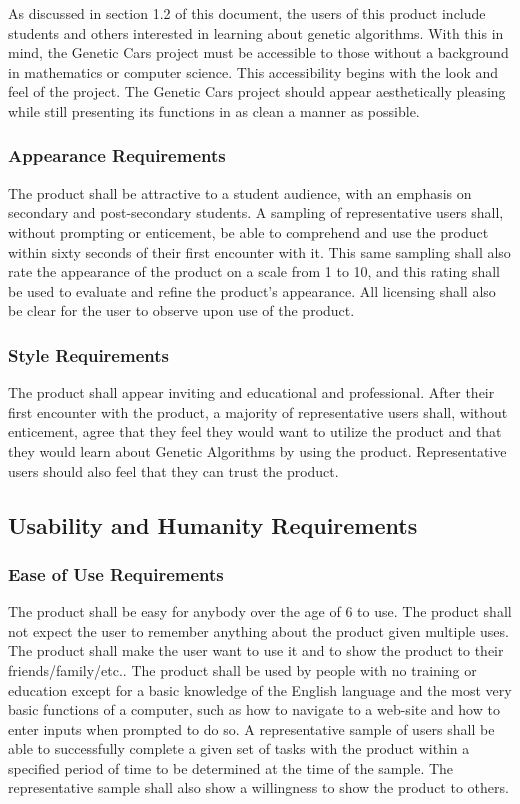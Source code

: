 \documentclass[12pt, titlepage]{article}
\begin{document}
As discussed in section 1.2 of this document, the users of this product include 
students and others interested in learning about genetic algorithms. With this 
in mind, the Genetic Cars project must be accessible to those without a 
background in mathematics or computer science. This accessibility begins with 
the look and feel of the project. The Genetic Cars project should appear 
aesthetically pleasing while still presenting its functions in as clean a manner 
as possible.

\subsubsection{Appearance Requirements}

The product shall be attractive to a student audience, with an emphasis on 
secondary and post-secondary students. A sampling of representative users shall, 
without prompting or enticement, be able to comprehend and use the product 
within sixty seconds of their first encounter with it. This same sampling shall 
also rate the appearance of the product on a scale from 1 to 10, and this rating 
shall be used to evaluate and refine the product's appearance. All licensing 
shall also be clear for the user to observe upon use of the product.

\subsubsection{Style Requirements}

The product shall appear inviting and educational and professional. After their 
first encounter with the product, a majority of representative users shall, 
without enticement, agree that they feel they would want to utilize the product 
and that they would learn about Genetic Algorithms by using the product. 
Representative users should also feel that they can trust the product.

\subsection{Usability and Humanity Requirements}

\subsubsection{Ease of Use Requirements}

The product shall be easy for anybody over the age of 6 to use. The product 
shall not expect the user to remember anything about the product given multiple 
uses. The product shall make the user want to use it and to show the product to 
their friends/family/etc.. The product shall be used by people with no training 
or education except for a basic knowledge of the English language and the most 
very basic functions of a computer, such as how to navigate to a web-site and 
how to enter inputs when prompted to do so. A representative sample of users 
shall be able to successfully complete a given set of tasks with the product 
within a specified period of time to be determined at the time of the sample. 
The representative sample shall also show a willingness to show the product to 
others.
\end{document}
